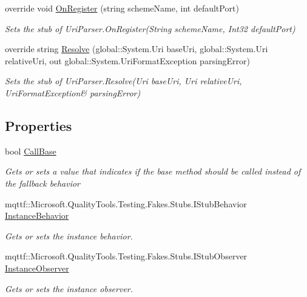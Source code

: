 \begin{DoxyCompactItemize}
override void \hyperlink{class_system_1_1_fakes_1_1_stub_uri_parser_a0a2387da37776646a5e4c63f7b0d29cf}{On\-Register} (string scheme\-Name, int default\-Port)
\begin{DoxyCompactList}\small\item\em Sets the stub of Uri\-Parser.\-On\-Register(\-String scheme\-Name, Int32 default\-Port)\end{DoxyCompactList}\item 
override string \hyperlink{class_system_1_1_fakes_1_1_stub_uri_parser_a0730533eb02969d546271c61611205af}{Resolve} (global\-::\-System.\-Uri base\-Uri, global\-::\-System.\-Uri relative\-Uri, out global\-::\-System.\-Uri\-Format\-Exception parsing\-Error)
\begin{DoxyCompactList}\small\item\em Sets the stub of Uri\-Parser.\-Resolve(Uri base\-Uri, Uri relative\-Uri, Uri\-Format\-Exception\& parsing\-Error)\end{DoxyCompactList}\end{DoxyCompactItemize}
\subsection*{Properties}
\begin{DoxyCompactItemize}
\item 
bool \hyperlink{class_system_1_1_fakes_1_1_stub_uri_parser_a0b29308f1d957393f2a98bb7e1f02283}{Call\-Base}
\begin{DoxyCompactList}\small\item\em Gets or sets a value that indicates if the base method should be called instead of the fallback behavior\end{DoxyCompactList}\item 
mqttf\-::\-Microsoft.\-Quality\-Tools.\-Testing.\-Fakes.\-Stubs.\-I\-Stub\-Behavior \hyperlink{class_system_1_1_fakes_1_1_stub_uri_parser_aa633895a425f3afe8f05b4d9718ea021}{Instance\-Behavior}
\begin{DoxyCompactList}\small\item\em Gets or sets the instance behavior.\end{DoxyCompactList}\item 
mqttf\-::\-Microsoft.\-Quality\-Tools.\-Testing.\-Fakes.\-Stubs.\-I\-Stub\-Observer \hyperlink{class_system_1_1_fakes_1_1_stub_uri_parser_a85d41ddf8554b7a760a15e5a027890b9}{Instance\-Observer}
\begin{DoxyCompactList}\small\item\em Gets or sets the instance observer.\end{DoxyCompactList}\end{DoxyCompactItemize}


